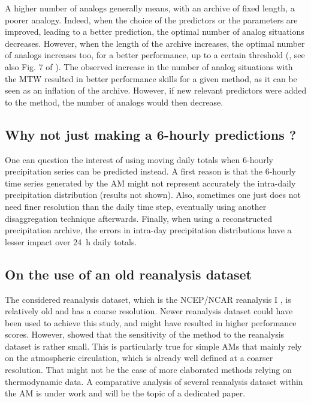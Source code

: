 \documentclass[hess, manuscript]{copernicus}
\begin{document}
A higher number of analogs generally means, with an archive of fixed length, a poorer analogy. Indeed, when the choice of the predictors or the parameters are improved, leading to a better prediction, the optimal number of analog situations decreases. However, when the length of the archive increases, the optimal number of analogs increases too, for a better performance, up to a certain threshold (\citealt{Bontron2004}, see also Fig. 7 of \citealt{Hamill2006a}). The observed increase in the number of analog situations with the MTW resulted in better performance skills for a given method, as it can be seen as an inflation of the archive. However, if new relevant predictors were added to the method, the number of analogs would then decrease.


\subsection{Why not just making a 6-hourly predictions ?}

One can question the interest of using moving daily totals when 6-hourly precipitation series can be predicted instead. A first reason is that the 6-hourly time series generated by the AM might not represent accurately the intra-daily precipitation distribution (results not shown). Also, sometimes one just does not need finer resolution than the daily time step, eventually using another disaggregation technique afterwards. Finally, when using a reconstructed precipitation archive, the errors in intra-day precipitation distributions have a lesser impact over 24~h daily totals.


\subsection{On the use of an old reanalysis dataset}
\label{sec:old_reanalysis}

The considered reanalysis dataset, which is the NCEP/NCAR reanalysis I \citep{Kalnay1996}, is relatively old and has a coarse resolution. Newer reanalysis dataset could have been used to achieve this study, and might have resulted in higher performance scores. However, \cite{BenDaoud2009} showed that the sensitivity of the method to the reanalysis dataset is rather small. This is particularly true for simple AMs that mainly rely on the atmospheric circulation, which is already well defined at a coarser resolution. That might not be the case of more elaborated methods relying on thermodynamic data. A comparative analysis of several reanalysis dataset within the AM is under work and will be the topic of a dedicated paper.
\end{document}
